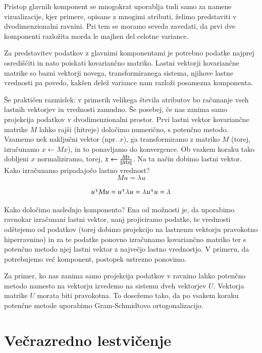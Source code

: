 Pristop glavnih komponent se mnogokrat uporablja tudi samo za namene vizualizacije, kjer primere, opisane z mnogimi atributi, želimo predstaviti v dvodimenzionalni ravnini. Pri tem se moramo seveda zavedati, da prvi dve komponenti razložita morda le majhen del celotne variance.

Za predstavitev podatkov z glavnimi komponentami je potrebno podatke najprej osrediščiti in nato poiskati kovariančno matriko. Lastni vektorji kovariančne matrike so bazni vektorji novega, transformiranega sistema, njihove lastne vrednosti pa povedo, kakšen delež variance nam razloži posamezna komponenta.

Še praktičen razmislek: v primerih velikega števila atributov bo računanje vseh lastnih vektorjev in vrednosti zamudno. Še posebej, če nas zanima samo projekcija podatkov v dvodimenzionalni prostor. Prvi lastni vektor kovariančne matrike $M$ lahko rajši (hitreje) določimo numerično, s potenčno metodo. Vzamemo nek naključni vektor (npr. $x$), ga transformiramo z matriko $M$ (torej, izračunamo $x\leftarrow M x$), in to ponavljamo do konvergence. Ob vsakem koraku tako dobljeni $x$ normaliziramo, torej, $x\leftarrow \frac{M x}{\left\lVert M x\right\rVert}$. Na ta način dobimo lastni vektor. Kako izračunamo pripadajočo lastno vrednost?
\begin{equation}
  M u = \lambda u
\end{equation}

\begin{equation}
  u^\intercal M u = u^\intercal \lambda u = \lambda u^\intercal u = \lambda
\end{equation}

Kako določimo naslednjo komponento? Ena od možnosti je, da uporabimo ravnokar izračunani lastni vektor, nanj projiciramo podatke, te vrednosti odštejemo od podatkov (torej dobimo projekcijo na lastnemu vektorju pravokotno hiperravnino) in za te podatke ponovno izračunamo kovariančno matriko ter s potenčno metodo njej lastni vektor z največjo lastno vrednostjo. V primeru, da potrebujemo več komponent, postopek ustrezno ponovimo.

Za primer, ko nas zanima samo projekcija podatkov v ravnino lahko potenčno metodo namesto na vektorju izvedemo na sistemu dveh vektorjev $U$. Vektorja matrike $U$ morata biti pravokotna. To dosežemo tako, da po vsakem koraku potenčne metode uporabimo Gram-Schmidtovo ortogonalizacijo.

\section{Večrazredno lestvičenje}

